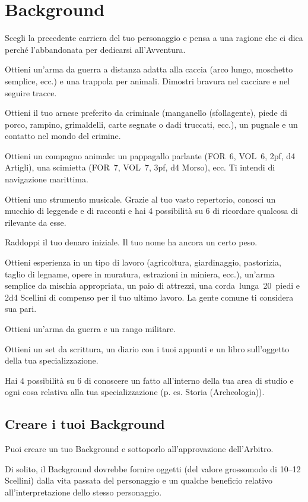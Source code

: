 \documentclass[itdr]{subfiles}
\begin{document}
\clearpage

\vfill
\section{Background}

Scegli la precedente carriera del tuo personaggio e pensa a una ragione che ci dica perché l’abbandonata per dedicarsi all'\mbox{Avventura}.

\vfill
{}
Ottieni un’arma da guerra a distanza adatta alla caccia (arco lungo, moschetto semplice, ecc.) e una trappola per animali. Dimostri bravura nel cacciare e nel seguire tracce.

\vfill
{}
Ottieni il tuo arnese preferito da criminale (manganello (sfollagente), piede di porco, rampino, grimaldelli, carte segnate o dadi truccati, ecc.), un pugnale e un contatto nel mondo del crimine.

\vfill
{}
Ottieni un compagno animale: un pappagallo parlante (FOR~6, VOL~6, 2pf, d4 Artigli), una scimietta (FOR~7, VOL~7, 3pf, d4 Morso), ecc. Ti intendi di navigazione marittima.

\vfill
{}
Ottieni uno strumento musicale. Grazie al tuo vasto repertorio, conosci un mucchio di leggende e di racconti e hai 4 possibilità su 6 di ricordare qualcosa di rilevante da esse.

\vfill
{}
Raddoppi il tuo denaro iniziale. Il tuo nome ha ancora un certo peso.

\vfill
{}
Ottieni esperienza in un tipo di lavoro (agricoltura, giardinaggio, pastorizia, taglio di legname, opere in muratura, estrazioni in miniera, ecc.), un’arma semplice da mischia appropriata, un paio di attrezzi, una \mbox{corda lunga 20 piedi} e 2d4 Scellini di compenso per il tuo ultimo lavoro. La gente \mbox{comune} ti considera sua pari.

\vfill
{}
Ottieni un’arma da guerra e un rango militare.

\vfill
{}
Ottieni un set da scrittura, un diario con i tuoi appunti e un libro sull’oggetto della tua specializzazione.

Hai 4 possibilità su 6 di conoscere un fatto all’interno della tua area di studio e ogni cosa relativa alla tua specializzazione (p. es. Storia (Archeologia)).

\vspace{5ex}
\break

\vfill
\begin{dbox}
\subsection*{Creare i tuoi Background}

Puoi creare un tuo Background e sottoporlo all’approvazione dell’Arbitro.

Di solito, il Background dovrebbe fornire oggetti (del valore grossomodo di 10--12 Scellini) dalla vita passata del personaggio e un qualche beneficio relativo all’interpretazione dello stesso personaggio.
\end{dbox}
\end{document}
